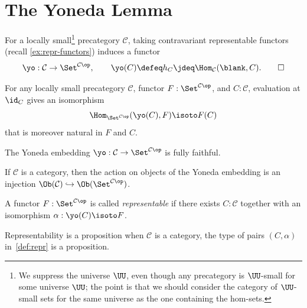 \section{The Yoneda Lemma}
\label{sec:yoneda}

\begin{definition}\label{def:yoneda}
  For a locally small\footnote{%
    We suppress the universe $\UU$,
    even though any precategory is $\UU$-small
    for some universe $\UU$;
    the point is that we should consider the category
    of $\UU$-small sets for the same universe
    as the one containing the hom-sets.}
  precategory $\mathcal C$,
  taking contravariant representable functors
  (recall \cref{ex:repr-functors}) induces a functor
  \[
    \yo : \mathcal C \to \Set^{\mathcal C\op} ,
    \qquad \yo(C) \defeq h_C \jdeq \Hom_{\mathcal C}(\blank, C).\qedhere
  \]
\end{definition}

\begin{theorem}\label{thm:yoneda-lemma}
  For any locally small precategory $\mathcal C$,
  functor $F : \Set^{\mathcal C\op}$, and $C:\mathcal C$,
  evaluation at $\id_C$ gives an isomorphism
  \[
    \Hom_{\Set^{\mathcal C\op}}(\yo(C), F) \isoto F(C)
  \]
  that is moreover natural in $F$ and $C$.
\end{theorem}

\begin{corollary}\label{cor:yo-ff}
  The Yoneda embedding $\yo : \mathcal C \to \Set^{\mathcal C\op}$
  is fully faithful.
\end{corollary}

\begin{corollary}\label{cor:yo-emb-obj}
  If $\mathcal C$ is a category, then the action on objects of the
  Yoneda embedding is an injection
  $\Ob(\mathcal C) \hookrightarrow \Ob(\Set^{\mathcal C\op})$.
\end{corollary}

\begin{definition}\label{def:repr}
  A functor $F : \Set^{\mathcal C\op}$ is called
  \emph{representable}
  if there exists $C : \mathcal C$ together with an isomorphism
  $\alpha : \yo(C) \isoto F$.
\end{definition}

\begin{corollary}\label{cor:repr-prop}
  Representability is a proposition when $\mathcal C$ is a category, \ie
  the type of pairs $(C,\alpha)$ in~\cref{def:repr} is a proposition.
\end{corollary}

